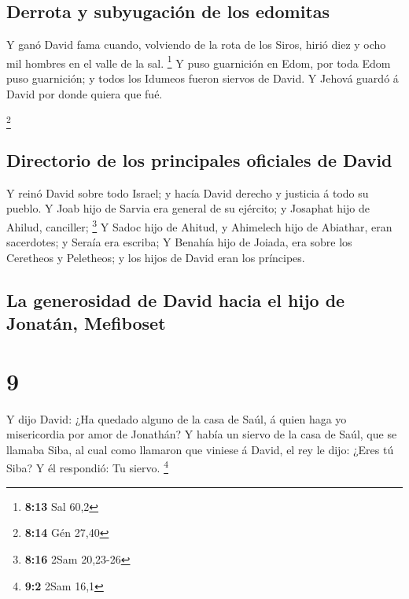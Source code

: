 \hypertarget{derrota-y-subyugaciuxf3n-de-los-edomitas}{%
\subsection{Derrota y subyugación de los
edomitas}\label{derrota-y-subyugaciuxf3n-de-los-edomitas}}

 Y ganó David fama cuando, volviendo de la rota de los
Siros, hirió diez y ocho mil hombres en el valle de la sal. \footnote{\textbf{8:13}
  Sal 60,2}  Y puso guarnición en Edom, por toda Edom
puso guarnición; y todos los Idumeos fueron siervos de David. Y Jehová
guardó á David por donde quiera que fué.

\footnote{\textbf{8:14} Gén 27,40}

\hypertarget{directorio-de-los-principales-oficiales-de-david}{%
\subsection{Directorio de los principales oficiales de
David}\label{directorio-de-los-principales-oficiales-de-david}}

 Y reinó David sobre todo Israel; y hacía David derecho y
justicia á todo su pueblo.  Y Joab hijo de Sarvia era
general de su ejército; y Josaphat hijo de Ahilud, canciller;
\footnote{\textbf{8:16} 2Sam 20,23-26}  Y Sadoc hijo de
Ahitud, y Ahimelech hijo de Abiathar, eran sacerdotes; y Seraía era
escriba;  Y Benahía hijo de Joiada, era sobre los
Ceretheos y Peletheos; y los hijos de David eran los príncipes.

\hypertarget{la-generosidad-de-david-hacia-el-hijo-de-jonatuxe1n-mefiboset}{%
\subsection{La generosidad de David hacia el hijo de Jonatán,
Mefiboset}\label{la-generosidad-de-david-hacia-el-hijo-de-jonatuxe1n-mefiboset}}

\hypertarget{section-8}{%
\section{9}\label{section-8}}

 Y dijo David: ¿Ha quedado alguno de la casa de Saúl, á
quien haga yo misericordia por amor de Jonathán?  Y había
un siervo de la casa de Saúl, que se llamaba Siba, al cual como llamaron
que viniese á David, el rey le dijo: ¿Eres tú Siba? Y él respondió: Tu
siervo. \footnote{\textbf{9:2} 2Sam 16,1}

